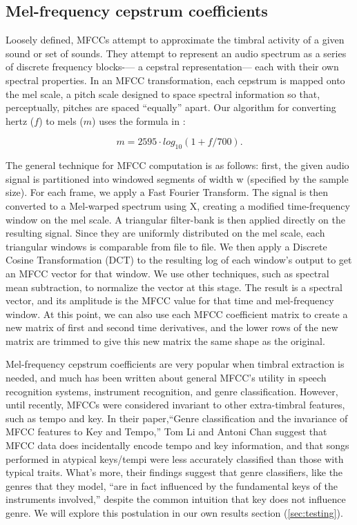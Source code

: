 \documentclass[12pt,twocolumn,titlepage]{article}
\begin{document}
\subsection{Mel-frequency cepstrum coefficients}

Loosely defined, MFCCs attempt to approximate the timbral activity of a given sound or set of sounds. They attempt to represent an audio spectrum as a series of discrete frequency blocks-— a cepstral representation— each with their own spectral properties. In an MFCC transformation, each cepstrum is mapped onto the mel scale, a pitch scale designed to space spectral information so that, perceptually, pitches are spaced ``equally'' apart. Our algorithm for converting hertz ($f$) to mels ($m$) uses the formula in \cite{Speechcomm}: 

\begin{equation}\label{}
m = 2595 \cdot log_{10}(1 + f/700).
\end{equation}

The general technique for MFCC computation is as follows: first, the given audio signal is partitioned into windowed segments of width w (specified by the sample size). For each frame, we apply a Fast Fourier Transform. The signal is then converted to a Mel-warped spectrum using X, creating a modified time-frequency window on the mel scale. A triangular filter-bank is then applied directly on the resulting signal. Since they are uniformly distributed on the mel scale, each triangular windows is comparable from file to file. \cite{Essid} We then apply a Discrete Cosine Transformation (DCT) to the resulting log of each window's output to get an MFCC vector for that window. We use other techniques, such as spectral mean subtraction, to normalize the vector at this stage. The result is a spectral vector, and its amplitude is the MFCC value for that time and mel-frequency window. At this point, we can also use each MFCC coefficient matrix to create a new matrix of first and second time derivatives, and the lower rows of the new matrix are trimmed to give this new matrix the same shape as the original. 


Mel-frequency cepstrum coefficients are very popular when timbral extraction is needed, and much has been written about general MFCC's utility in speech recognition systems, instrument recognition, and genre classification. However, until recently, MFCCs were considered invariant to other extra-timbral features, such as tempo and key. In their paper,``Genre classification and the invariance of MFCC features to Key and Tempo,'' Tom Li and Antoni Chan suggest that MFCC data does incidentally encode tempo and key information, and that songs performed in atypical keys/tempi were less accurately classified than those with typical traits. What's more, their findings suggest that genre classifiers, like the genres that they model, ``are in fact influenced by the fundamental keys of the instruments involved,'' despite the common intuition that key does not influence genre. \cite{LiChan} We will explore this postulation in our own results section (\ref{sec:testing}).
\end{document}

